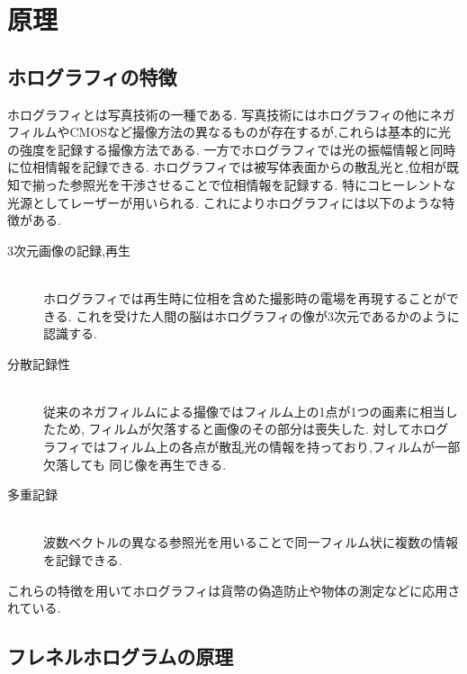 \section{原理}
\subsection{ホログラフィの特徴}
ホログラフィとは写真技術の一種である.
写真技術にはホログラフィの他にネガフィルムやCMOSなど撮像方法の異なるものが存在するが,これらは基本的に光の強度を記録する撮像方法である.
一方でホログラフィでは光の振幅情報と同時に位相情報を記録できる.
ホログラフィでは被写体表面からの散乱光と,位相が既知で揃った参照光を干渉させることで位相情報を記録する.
特にコヒーレントな光源としてレーザーが用いられる.
これによりホログラフィには以下のような特徴がある.
\begin{description}
  \item [3次元画像の記録,再生] \text{ }\\
  ホログラフィでは再生時に位相を含めた撮影時の電場を再現することができる.
  これを受けた人間の脳はホログラフィの像が3次元であるかのように認識する.
  \item [分散記録性] \text{ }\\
  従来のネガフィルムによる撮像ではフィルム上の1点が1つの画素に相当したため,
  フィルムが欠落すると画像のその部分は喪失した.
  対してホログラフィではフィルム上の各点が散乱光の情報を持っており,フィルムが一部欠落しても
  同じ像を再生できる.
  \item [多重記録] \text{ }\\
  波数ベクトルの異なる参照光を用いることで同一フィルム状に複数の情報を記録できる.
\end{description}
これらの特徴を用いてホログラフィは貨幣の偽造防止や物体の測定などに応用されている.
\subsection{フレネルホログラムの原理}